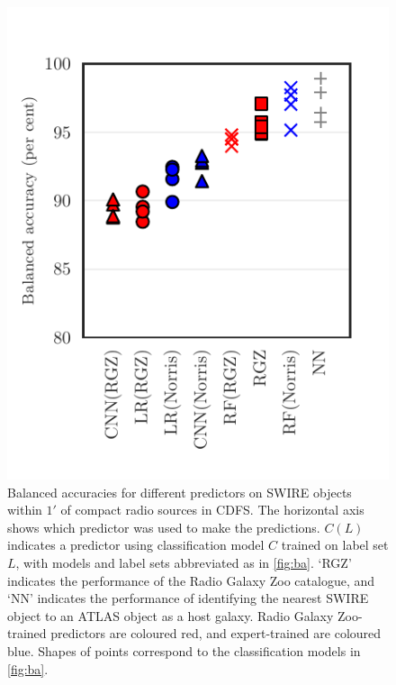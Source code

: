 \documentclass[fleqn,usenatbib,usedcolumn]{mnras}
\begin{document}
    \begin{figure}
      \centering
      \includegraphics[width=0.8\columnwidth]{images/compact-ba.pdf}
      \caption{Balanced accuracies for different predictors on SWIRE objects
        within $1'$ of compact radio sources in CDFS. The horizontal axis
        shows which predictor was used to make the predictions. $C(L)$
        indicates a predictor using classification model $C$ trained on label
        set $L$, with models and label sets abbreviated as in
        \autoref{fig:ba}. `RGZ' indicates the performance of the Radio Galaxy
        Zoo catalogue, and `NN' indicates the performance of identifying the
        nearest SWIRE object to an ATLAS object as a host galaxy. Radio Galaxy
        Zoo-trained predictors are coloured red, and expert-trained are
        coloured blue. Shapes of points correspond to the classification
        models in \autoref{fig:ba}.
        \label{fig:compact-ba}}
    \end{figure}
\end{document}
